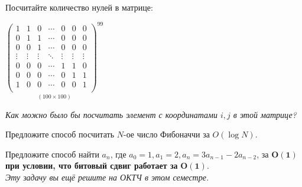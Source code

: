 	\begin{problem}{
		Посчитайте количество нулей в матрице: \\
			\centerline{
				$\underset{(100 \times 100)}{\begin{pmatrix}
					1 & 1 & 0 & \cdots & 0 & 0 & 0 \\
					0 & 1 & 1 & \cdots & 0 & 0 & 0 \\
					0 & 0 & 1 & \cdots & 0 & 0 & 0 \\
					\vdots & \vdots & \vdots  & \ddots & \vdots & \vdots & \vdots \\
					0 & 0 & 0 & \cdots & 1 & 1 & 0 \\
					0 & 0 & 0 & \cdots & 0 & 1 & 1 \\
					1 & 0 & 0 & \cdots & 0 & 0 & 1  \\
				\end{pmatrix}^{99}}$
			}
		\textit{Как можно было бы посчитать элемент с координатами $i, j$ в этой матрице?}
		
	}\end{problem}

	\begin{problem}
		Предложите способ посчитать $N$-ое число Фибоначчи за $O(\log N)$. 	
	\end{problem}

	\begin{problem}
		Предложите способ найти $a_n$, где $a_0 = 1, a_1 = 2, a_n = 3a_{n-1} - 2a_{n-2}$, за $\mathbf{O(1)}$ \textbf{при условии, что битовый сдвиг работает за} $\mathbf{O(1)}$.
		\\
		\textit{Эту задачу вы ещё решите на ОКТЧ в этом семестре.}
	\end{problem}

